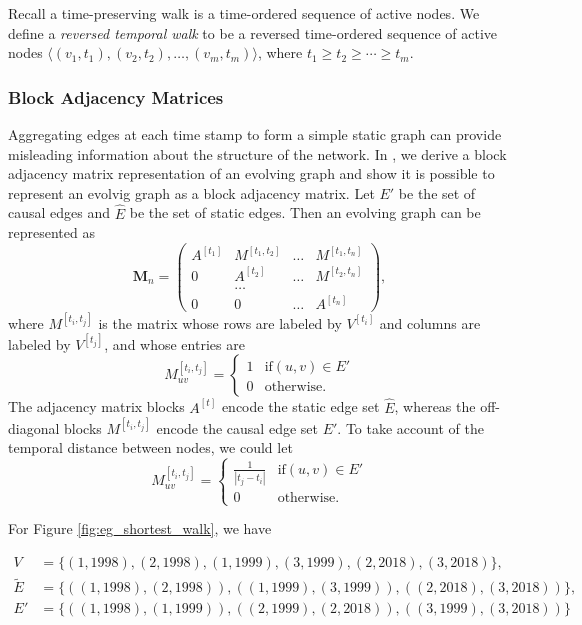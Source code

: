 \documentclass[12pt]{article}
\theoremstyle{definition}
\begin{document}
Recall a time-preserving walk is a time-ordered sequence of active nodes. We define a \emph{reversed temporal walk} to be a reversed time-ordered sequence of active nodes
$\langle (v_1, t_1), (v_2,t_2), \ldots, (v_m, t_m)\rangle$, where
$t_1 \ge t_2 \ge \cdots \ge t_m$.


\subsubsection{Block Adjacency Matrices}
\label{sec:centr-block-adjac}

Aggregating edges at each time stamp to form
a simple static graph can provide misleading information about the structure of the network.
In \cite{chen16}, we derive a block adjacency matrix representation of an evolving graph and
show it is possible to represent an evolvig graph as a block adjacency matrix.
Let $E'$ be the set of causal edges and $\hat E$ be the set of static edges. Then
an evolving graph can be represented as
$$
\bm M_n =
\begin{pmatrix}
A^{[t_1]} & M^{[t_1, t_2]} & \ldots & M^{[t_1, t_n]} \\
0         & A^{[t_2]} & \ldots & M^{[t_2, t_n]} \\
          & \ldots    &        &     \\
0         & 0         & \ldots & A^{[t_n]}
\end{pmatrix},
$$
where $M^{[t_i, t_j]}$ is the matrix whose rows are labeled by $V^{[t_i]}$ and columns are labeled by $V^{[t_j]}$, and whose entries are
$$
  M_{uv}^{[t_i, t_j]} =
  \begin{cases}
    1 & \mbox{if} (u, v) \in E' \\
    0 & \mbox{otherwise}.
  \end{cases}
$$
The adjacency matrix blocks $A^{[t]}$ encode the static edge set $\hat E$, whereas the off-diagonal blocks $M^{[t_i, t_j]}$ encode the causal edge set $E'$. To take account of the temporal distance between nodes, we could let
$$
  M_{uv}^{[t_i, t_j]} =
  \begin{cases}
    \frac{1}{|t_j - t_i|} & \mbox{if} (u, v) \in E' \\
    0 & \mbox{otherwise}.
  \end{cases}
$$

For Figure \ref{fig:eg_shortest_walk}, we have

\begin{align*}
V & = \{(1,\!1998), (2,\!1998), (1,\!1999), (3,\!1999), (2,\!2018), (3,\!2018)\},\\
\tilde E &= \{((1,\!1998), (2,\!1998)), ((1,\!1999), (3,\!1999)), ((2,\!2018), (3,\!2018))\},\\
E'  &= \{((1,\!1998), (1,\!1999)), ((2,\!1999), (2,\!2018)), ((3,\!1999), (3,\!2018))\}
\end{align*}
\end{document}

